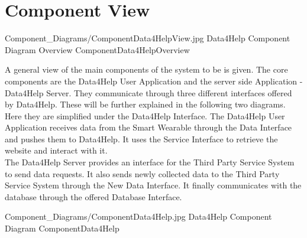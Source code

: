 \documentclass[../../DD.tex]{subfiles}
\begin{document}
\section{Component View\label{sect:2.2}}

	\image {13cm} {Component_Diagrams/ComponentData4HelpView.jpg} {Data4Help Component Diagram Overview} {ComponentData4HelpOverview}

	A general view of the main components of the system to be is given. The core components are the Data4Help User Application and the server side Application - Data4Help Server. They communicate through three different interfaces offered by Data4Help. These will be further explained in the following two diagrams. Here they are simplified under the Data4Help Interface. The Data4Help User Application receives data from the Smart Wearable through the Data Interface and pushes them to Data4Help. It uses the Service Interface to retrieve the  website and interact with it.\\
	The Data4Help Server provides an interface for the Third Party Service System to send data requests. It also sends newly collected data to the Third Party Service System through the New Data Interface. It finally communicates with the database through the offered Database Interface.

	\image {13cm} {Component_Diagrams/ComponentData4Help.jpg} {Data4Help Component Diagram} {ComponentData4Help}
\end{document}
